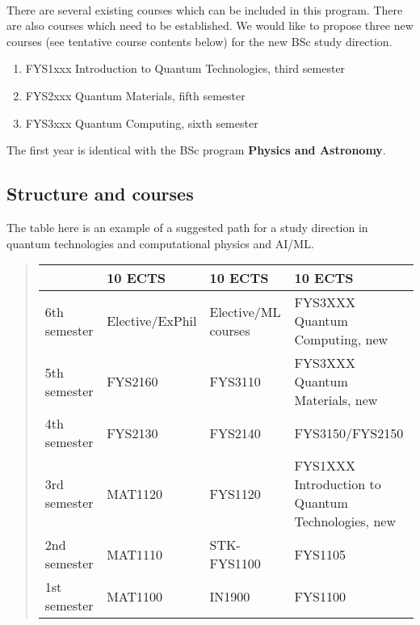 \documentclass[%
oneside,                 %
final,                   %
10pt]{article}
\begin{document}
\paragraph{}
There are several existing courses which can be included in this
program. There are also courses which need to be established.
We would like to propose three new courses (see tentative course contents below) for the new BSc study direction.
\begin{enumerate}
\item FYS1xxx Introduction to Quantum Technologies, third semester

\item FYS2xxx Quantum Materials, fifth semester

\item FYS3xxx Quantum Computing, sixth semester
\end{enumerate}

\noindent
The first year is identical with the BSc program \textbf{Physics and Astronomy}.



\subsection*{Structure and courses}

The table here is an example of a suggested path for a study direction
in quantum technologies and computational physics and AI/ML.


\begin{quote}
\begin{tabular}{llll}
\hline
\multicolumn{1}{l}{  } & \multicolumn{1}{l}{ 10 ECTS } & \multicolumn{1}{l}{ 10 ECTS } & \multicolumn{1}{l}{ 10 ECTS } \\
\hline
6th semester & Elective/ExPhil & Elective/ML courses & FYS3XXX Quantum Computing, new                    \\
\hline
5th semester & FYS2160         & FYS3110             & FYS3XXX Quantum Materials, new                    \\
\hline
4th semester & FYS2130         & FYS2140             & FYS3150/FYS2150                                   \\
\hline
3rd semester & MAT1120         & FYS1120             & FYS1XXX Introduction to Quantum Technologies, new \\
\hline
2nd semester & MAT1110         & STK-FYS1100         & FYS1105                                           \\
\hline
1st semester & MAT1100         & IN1900              & FYS1100                                           \\
\hline
\end{tabular}
\end{quote}
\end{document}

